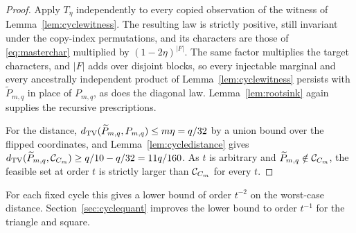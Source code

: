 \begin{proof}
Apply $T_\eta$ independently to every copied observation of the witness of Lemma~\ref{lem:cyclewitness}. The resulting law is strictly positive, still invariant under the copy-index permutations, and its characters are those of \eqref{eq:masterchar} multiplied by $(1-2\eta)^{|F|}$. The same factor multiplies the target characters, and $|F|$ adds over disjoint blocks, so every injectable marginal and every ancestrally independent product of Lemma~\ref{lem:cyclewitness} persists with $\widetilde P_{m,q}$ in place of $P_{m,q}$, as does the diagonal law. Lemma~\ref{lem:rootsink} again supplies the recursive prescriptions.

For the distance, $d_{\operatorname{TV}}(\widetilde P_{m,q},P_{m,q})\le m\eta=q/32$ by a union bound over the flipped coordinates, and Lemma~\ref{lem:cycledistance} gives $d_{\operatorname{TV}}(\widetilde P_{m,q},\mathcal C_{C_m})\ge q/10-q/32=11q/160$. As $t$ is arbitrary and $\widetilde P_{m,q}\notin\mathcal C_{C_m}$, the feasible set at order $t$ is strictly larger than $\mathcal C_{C_m}$ for every $t$.
\end{proof}

For each fixed cycle this gives a lower bound of order $t^{-2}$ on the worst-case distance. Section~\ref{sec:cyclequant} improves the lower bound to order $t^{-1}$ for the triangle and square.
